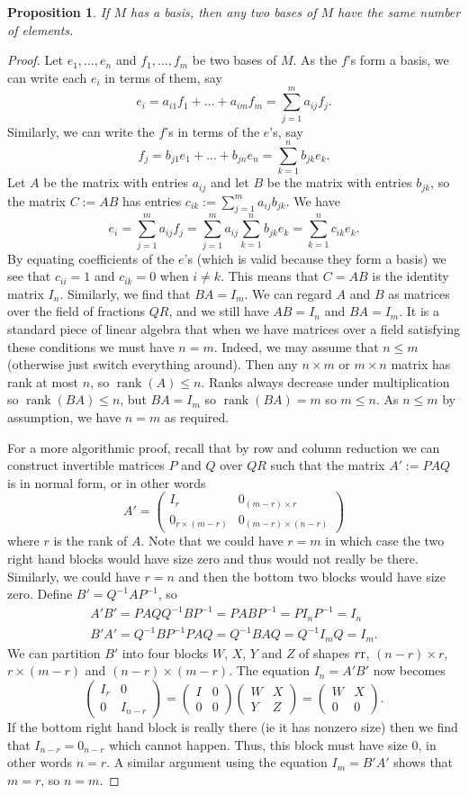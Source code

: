 \documentclass{amsart}
\newcommand{\rank}      {\operatorname{rank}}
\newcommand{\tm}        {\times}
\newcommand{\bmat}[4] {
 \left(\begin{array}{c|c} #1&#2 \\ \hline #3&#4\end{array}\right)}
\renewcommand{\:}{\colon}
\newtheorem{proposition}[theorem]{Proposition}
\theoremstyle{definition}
\begin{document}
\begin{proposition}
 If $M$ has a basis, then any two bases of $M$ have the same number of
 elements. 
\end{proposition}
\begin{proof}
 Let $e_1,\ldots,e_n$ and $f_1,\ldots,f_m$ be two bases of $M$.  As
 the $f$'s form a basis, we can write each $e_i$ in terms of them, say
 \[ e_i=a_{i1}f_1+\ldots+a_{im}f_m=\sum_{j=1}^m a_{ij}f_j. \]
 Similarly, we can write the $f$'s in terms of the $e$'s, say
 \[ f_j=b_{j1}e_1+\ldots+b_{jn}e_n=\sum_{k=1}^n b_{jk}e_k. \]
 Let $A$ be the matrix with entries $a_{ij}$ and let $B$ be the matrix
 with entries $b_{jk}$, so the matrix $C:=AB$ has entries
 $c_{ik}:=\sum_{j=1}^ma_{ij}b_{jk}$.  We have
 \[ e_i =  \sum_{j=1}^m a_{ij}f_j = 
           \sum_{j=1}^m a_{ij}\sum_{k=1}^n b_{jk} e_k =
           \sum_{k=1}^n c_{ik} e_k. 
 \]
 By equating coefficients of the $e$'s (which is valid because they
 form a basis) we see that $c_{ii}=1$ and $c_{ik}=0$ when $i\neq k$.
 This means that $C=AB$ is the identity matrix $I_n$.  Similarly, we
 find that $BA=I_m$.  We can regard $A$ and $B$ as matrices over the
 field of fractions $QR$, and we still have $AB=I_n$ and $BA=I_m$.  It
 is a standard piece of linear algebra that when we have matrices over
 a field satisfying these conditions we must have $n=m$.  Indeed, we
 may assume that $n\leq m$ (otherwise just switch everything around).
 Then any $n\tm m$ or $m\tm n$ matrix has rank at most $n$, so
 $\rank(A)\leq n$.  Ranks always decrease under multiplication so
 $\rank(BA)\leq n$, but $BA=I_m$ so $\rank(BA)=m$ so $m\leq n$.  As
 $n\leq m$ by assumption, we have $n=m$ as required.

 For a more algorithmic proof, recall that by row and column reduction
 we can construct invertible matrices $P$ and $Q$ over $QR$ such that
 the matrix $A':=PAQ$ is in normal form, or in other words
 \[ A' = \bmat{I_r}{0_{(m-r)\tm r}}{0_{r\tm(m-r)}}{0_{(m-r)\tm(n-r)}}
 \]
 where $r$ is the rank of $A$.  Note that we could have $r=m$ in which
 case the two right hand blocks would have size zero and thus would
 not really be there.  Similarly, we could have $r=n$ and then the
 bottom two blocks would have size zero.  Define $B'=Q^{-1}AP^{-1}$,
 so
 \begin{align*}
  A'B' = PAQQ^{-1}BP^{-1}=PABP^{-1}=PI_nP^{-1}=I_n \\
  B'A' = Q^{-1}BP^{-1}PAQ=Q^{-1}BAQ=Q^{-1}I_mQ=I_m.
 \end{align*}
 We can partition $B'$ into four blocks $W$, $X$, $Y$ and $Z$ of
 shapes $r\rm r$, $(n-r)\tm r$, $r\tm(m-r)$ and $(n-r)\tm(m-r)$.  The
 equation $I_n=A'B'$ now becomes
 \[ \bmat{I_r}{0}{0}{I_{n-r}} = \bmat{I}{0}{0}{0} \bmat{W}{X}{Y}{Z}
                              = \bmat{W}{X}{0}{0}.
 \]
 If the bottom right hand block is really there (ie it has nonzero
 size) then we find that $I_{n-r}=0_{n-r}$ which cannot happen.  Thus,
 this block must have size $0$, in other words $n=r$.  A similar
 argument using the equation $I_m=B'A'$ shows that $m=r$, so $n=m$.
\end{proof}
\end{document}
